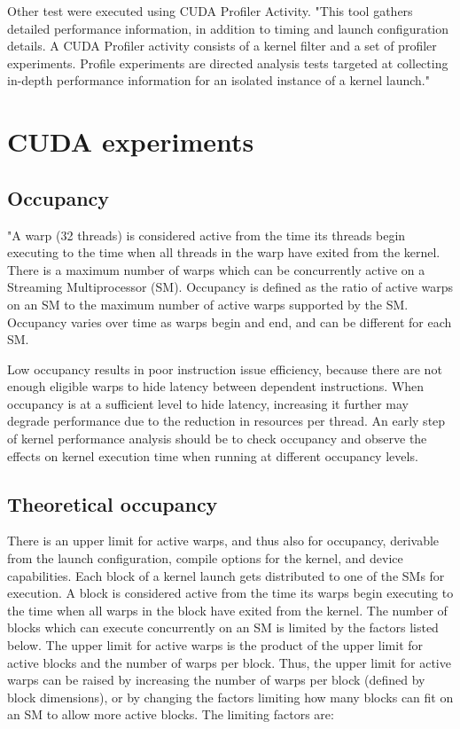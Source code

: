 \documentclass[oneside,openright,12pt,final,en]{mgr}
\begin{document}
Other test were executed using CUDA Profiler Activity. "This tool gathers detailed performance information, in addition to timing and launch configuration details. A CUDA Profiler activity consists of a kernel filter and a set of profiler experiments. Profile experiments are directed analysis tests targeted at collecting in-depth performance information for an isolated instance of a kernel launch."\cite{nsight}

\section{CUDA experiments}

\subsection{Occupancy}
"A warp (32 threads) is considered active from the time its threads begin executing to the time when all threads in the warp have exited from the kernel. There is a maximum number of warps which can be concurrently active on a Streaming Multiprocessor (SM). Occupancy is defined as the ratio of active warps on an SM to the maximum number of active warps supported by the SM. Occupancy varies over time as warps begin and end, and can be different for each SM.

Low occupancy results in poor instruction issue efficiency, because there are not enough eligible warps to hide latency between dependent instructions. When occupancy is at a sufficient level to hide latency, increasing it further may degrade performance due to the reduction in resources per thread. An early step of kernel performance analysis should be to check occupancy and observe the effects on kernel execution time when running at different occupancy levels.

\subsection{Theoretical occupancy}
There is an upper limit for active warps, and thus also for occupancy, derivable from the launch configuration, compile options for the kernel, and device capabilities. Each block of a kernel launch gets distributed to one of the SMs for execution. A block is considered active from the time its warps begin executing to the time when all warps in the block have exited from the kernel. The number of blocks which can execute concurrently on an SM is limited by the factors listed below. The upper limit for active warps is the product of the upper limit for active blocks and the number of warps per block. Thus, the upper limit for active warps can be raised by increasing the number of warps per block (defined by block dimensions), or by changing the factors limiting how many blocks can fit on an SM to allow more active blocks. The limiting factors are:
\end{document}
